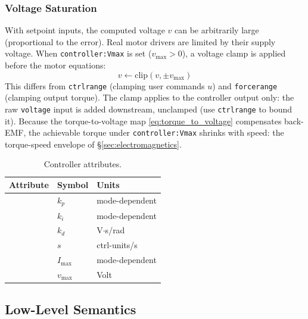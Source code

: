 \documentclass[10pt, a4paper, twocolumn]{article}
\let\oldtexttt\texttt
\renewcommand{\texttt}[1]{{\smaller\oldtexttt{#1}}}
\newcommand{\atVMAX}{\texttt{controller:Vmax}}
\newcommand{\atKP}{\texttt{controller:kp}}
\newcommand{\atKI}{\texttt{controller:ki}}
\newcommand{\atKD}{\texttt{controller:kd}}
\newcommand{\atSLEW}{\texttt{controller:slewmax}}
\newcommand{\atIMAXINT}{\texttt{controller:Imax}}
\begin{document}
\subsubsection{Voltage Saturation}
\label{sec:voltage_saturation}

With setpoint inputs, the computed voltage $v$ can be arbitrarily large (proportional to the error). Real motor drivers are limited by their supply voltage. When \atVMAX{} is set ($v_{\max} > 0$), a voltage clamp is applied before the motor equations:
\begin{equation*}
  v \leftarrow \text{clip}(v, \pm v_{\max})
  \label{eq:vlimit}
\end{equation*}
This differs from \texttt{ctrlrange} (clamping user commands $u$) and \texttt{forcerange} (clamping output torque). The clamp applies to the controller output only: the raw \texttt{voltage} input is added downstream, unclamped (use \texttt{ctrlrange} to bound it). Because the torque-to-voltage map \eqref{eq:torque_to_voltage} compensates back-EMF, the achievable torque under \atVMAX{} shrinks with speed: the torque-speed envelope of \S\ref{sec:electromagnetics}.

\begin{table}[H]
\centering
\small
\begin{tabular}{@{}lll@{}}
\toprule
Attribute & Symbol & Units \\
\midrule
\atKP{} & $k_p$ & mode-dependent \\
\atKI{} & $k_i$ & mode-dependent \\
\atKD{} & $k_d$ & V$\cdot$s/rad \\
\atSLEW{} & $s$ & ctrl-units/s \\
\atIMAXINT{} & $I_{\max}$ & mode-dependent \\
\atVMAX{} & $v_{\max}$ & Volt \\
\bottomrule
\end{tabular}
\caption{Controller attributes.}
\label{tab:controller_attrs}
\end{table}

\vfill\newpage

\subsection{Low-Level Semantics}
\label{sec:array_semantics}
\end{document}
